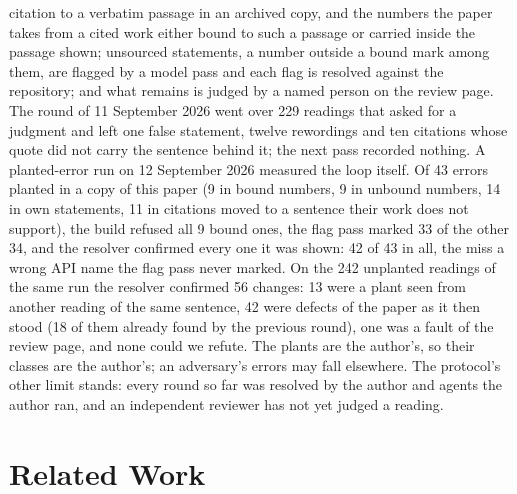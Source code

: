 \documentclass[11pt,a4paper]{article}
\begin{document}
citation to a verbatim passage in an archived copy, and the numbers the paper takes from a cited work either bound to such a passage or carried inside the passage shown; unsourced statements, a number outside a bound mark among them, are flagged by a model pass and each flag is resolved against the repository; and what remains is judged by a named person on the review page. The round of 11 September 2026 went over 229 readings that asked for a judgment and left one false statement, twelve rewordings and ten citations whose quote did not carry the sentence behind it; the next pass recorded nothing. A planted-error run on 12 September 2026 measured the loop itself. Of 43 errors planted in a copy of this paper (9 in bound numbers, 9 in unbound numbers, 14 in own statements, 11 in citations moved to a sentence their work does not support), the build refused all 9 bound ones, the flag pass marked 33 of the other 34, and the resolver confirmed every one it was shown: 42 of 43 in all, the miss a wrong API name the flag pass never marked. On the 242 unplanted readings of the same run the resolver confirmed 56 changes: 13 were a plant seen from another reading of the same sentence, 42 were defects of the paper as it then stood (18 of them already found by the previous round), one was a fault of the review page, and none could we refute. The plants are the author's, so their classes are the author's; an adversary's errors may fall elsewhere. The protocol's other limit stands: every round so far was resolved by the author and agents the author ran, and an independent reviewer has not yet judged a reading.

\section{Related Work}
\label{sec:related}
\end{document}
